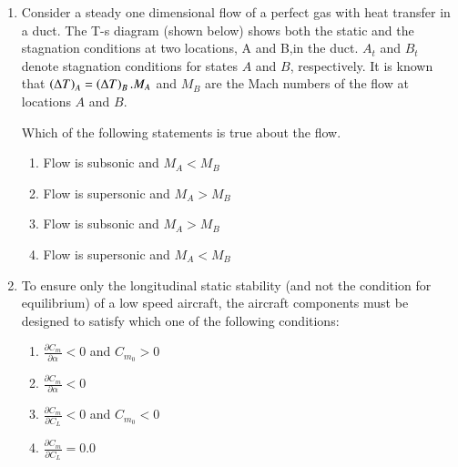 \documentclass[journal,12pt,onecolumn]{IEEEtran}
\theoremstyle{remark}
\begin{document}
\begin{enumerate}[start=1]
\item Consider a steady one dimensional flow of a perfect gas with heat transfer in a duct. The T-s diagram (shown below) shows both the static and the stagnation conditions at two locations, A and B,in the duct. $A_t$ and $B_t$ denote stagnation conditions for states $A$ and $B$, respectively. It is known that $\left(\Delta T\right)_A=\left(\Delta T\right)_B. M_A$ and $M_B$ are the Mach numbers of the flow at locations $A$ and $B$.\\
	\begin{center}
\end{center}
Which of the following statements is true about the flow.
\begin{enumerate}
	\item Flow is subsonic and $M_A<M_B$
	\item Flow is supersonic and $M_A>M_B$
	\item Flow is subsonic and $M_A>M_B$
	\item Flow is supersonic and $M_A<M_B$
\end{enumerate}

\item To ensure only the longitudinal static stability (and not the condition for equilibrium) of a low speed aircraft, the aircraft components must be designed to satisfy which one of the following conditions:
	\begin{enumerate}
		\item $\frac{\partial C_m}{\partial \alpha}<0$ and $C_{m_0}>0$
		\item $\frac{\partial C_m}{\partial \alpha}<0$ 
		\item $\frac{\partial C_m}{\partial {C_L}}<0$ and $C_{m_0}<0$
		\item $\frac{\partial C_m}{\partial {C_L}}=0.0$
	\end{enumerate}


\end{enumerate}
\end{document}
